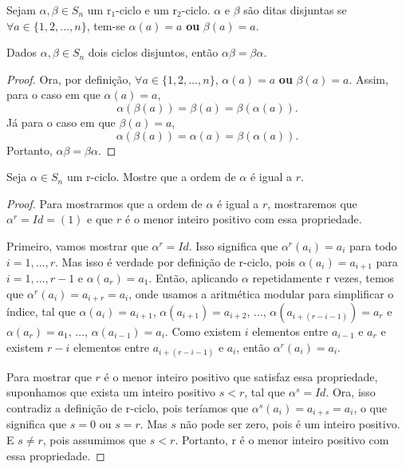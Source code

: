 \documentclass[11pt,openany]{book}
\begin{document}
\begin{definition}
\label{def:permutacaoes_disjuntas}
    Sejam $\alpha, \beta \in S_n$ um r$_1$-ciclo e um r$_2$-ciclo. $\alpha$ e $\beta$ são ditas disjuntas se $\forall a \in \{1,2,\dots,n\}$, tem-se $\alpha(a) = a$ \textbf{ou} $\beta(a) = a$.
\end{definition}

\begin{proposition}
\label{prop:permutacoes_disjuntas_comutacao}
Dados $\alpha, \beta \in S_n$ dois ciclos disjuntos, então $\alpha \beta = \beta \alpha$.
\end{proposition}

\begin{proof}
    Ora, por definição, $\forall a \in \{1,2,\dots,n\}$, $\alpha(a) = a$ \textbf{ou} $\beta(a) = a$. Assim, para o caso em que $\alpha(a) = a$,
    \[\alpha(\beta(a)) = \beta(a) = \beta(\alpha(a)).\]
    Já para o caso em que $\beta(a) = a$,
    \[\alpha(\beta(a)) = \alpha(a) = \beta(\alpha(a)).\]
    Portanto, $\alpha \beta = \beta \alpha$.
\end{proof}

\begin{proposition}
\label{prop:ordem_r_ciclo}
    Seja $\alpha \in S_n$ um r-ciclo. Mostre que a ordem de $\alpha$ é igual a $r$.
\end{proposition}

\begin{proof}
    Para mostrarmos que a ordem de $\alpha$ é igual a $r$, mostraremos que $\alpha^r = Id = (1)$ e que $r$ é o menor inteiro positivo com essa propriedade.
    
    Primeiro, vamos mostrar que $\alpha^r = Id$. Isso significa que $\alpha^r(a_i) = a_i$ para todo $i = 1, \dots, r$. Mas isso é verdade por definição de r-ciclo, pois $\alpha(a_i) = a_{i+1}$ para $i = 1, \dots, r-1$ e $\alpha(a_r) = a_1$. Então, aplicando $\alpha$ repetidamente r vezes, temos que $\alpha^r(a_i) = a_{i+r} = a_i$, onde usamos a aritmética modular para simplificar o índice, tal que $\alpha(a_i) = a_{i+1}$, $\alpha(a_{i+1}) = a_{i+2}$, $\dots$, $\alpha(a_{i+(r-i-1)}) = a_{r}$ e $\alpha(a_r) = a_{1}$, $\dots$, $\alpha(a_{i-1}) = a_{i}$. Como existem $i$ elementos entre $a_{i-1}$ e $a_r$ e existem $r-i$ elementos entre $a_{i+(r-i-1)}$ e $a_i$, então $\alpha^r(a_i) = a_i$.

    Para mostrar que $r$ é o menor inteiro positivo que satisfaz essa propriedade, suponhamos que exista um inteiro positivo $s < r$, tal que $\alpha^s = Id$. Ora, isso contradiz a definição de r-ciclo, pois teríamos que $\alpha^s(a_i) = a_{i+s} = a_i$, o que significa que $s = 0$ ou $s = r$. Mas $s$ não pode ser zero, pois é um inteiro positivo. E $s \not= r$, pois assumimos que $s < r$. Portanto, r é o menor inteiro positivo com essa propriedade.
\end{proof}
\end{document}
